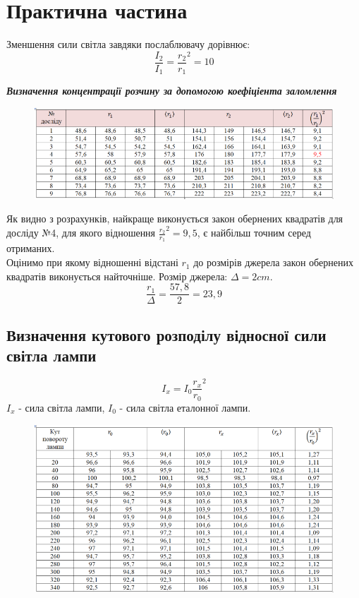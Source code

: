 \section{Практична частина}
\setlength{\parindent}{4em}
\qquad Зменшення сили світла завдяки послаблювачу дорівнює:
$$\frac{I_2}{I_1} = {\frac{r_2}{r_1}}^2 = 10$$
\begin{center}
  {\textbf{\emph{Визначення концентрації розчину за допомогою коефіціента заломлення}}}
\end{center}
\begin{figure}[ht]

\centering

\includegraphics[width=0.55\linewidth]{Pics/tabl1.png}

\label{table1}

\end{figure}
Як видно з розрахунків, найкраще виконується закон обернених квадратів для досліду №4, для якого відношення ${\frac{r_2}{r_1}}^2 = 9,5$, є найбільш точним серед отриманих. \\
Оцінимо при якому відношенні відстані $r_1$ до розмірів джерела закон обернених квадратів виконується найточніше. Розмір джерела: $\Delta = 2 cm$.
$$\frac{r_1}{\Delta} = \frac{57,8}{2} = 23,9$$
\subsection{Визначення кутового розподілу відносної сили світла лампи}
$$I_x = I_0 {\frac{r_x}{r_0}}^2$$
$I_x$ - сила світла лампи, $I_0$ - сила світла еталонної лампи.

\begin{figure}[ht]

\centering

\includegraphics[width=0.7\linewidth]{Pics/tabl2.png}

\label{table1}

\end{figure}

